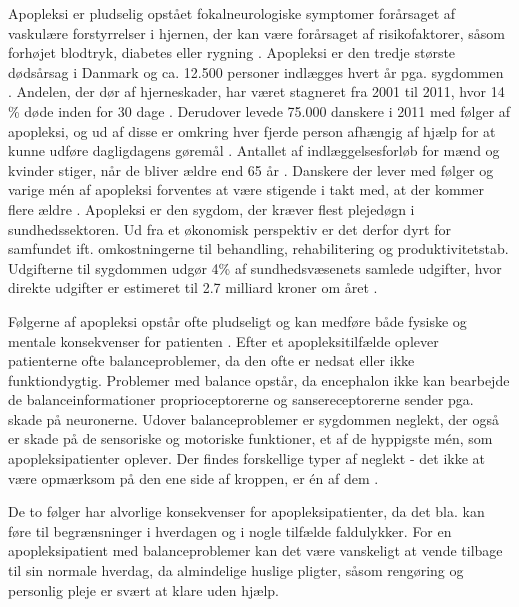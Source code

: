 Apopleksi er pludselig opstået fokalneurologiske symptomer forårsaget af vaskulære forstyrrelser i hjernen, der kan være forårsaget af risikofaktorer, såsom forhøjet blodtryk, diabetes eller rygning \cite{Sundhedsstyrelsen2009,Academic2015}. Apopleksi er den tredje største dødsårsag i Danmark og ca. 12.500 personer indlægges hvert år pga. sygdommen \cite{Hjernesagen2015a}. Andelen, der dør af hjerneskader, har været stagneret fra 2001 til 2011, hvor 14 \% døde inden for 30 dage \cite{Hjernesagen2015}. Derudover levede 75.000 danskere i 2011 med følger af apopleksi, og ud af disse er omkring hver fjerde person afhængig af hjælp for at kunne udføre dagligdagens gøremål \cite{Hjernesagen2015a}. Antallet af indlæggelsesforløb for mænd og kvinder stiger, når de bliver ældre end 65 år \cite{Sundhedsstyrelsen2011}.
Danskere der lever med følger og varige mén af apopleksi forventes at være stigende i takt med, at der kommer flere ældre \cite{Sagen2014}. Apopleksi er den sygdom, der kræver flest plejedøgn i sundhedssektoren. Ud fra et økonomisk perspektiv er det derfor dyrt for samfundet ift. omkostningerne til behandling, rehabilitering og produktivitetstab.  Udgifterne til sygdommen udgør 4\% af sundhedsvæsenets samlede udgifter, hvor direkte udgifter er estimeret til 2.7 milliard kroner om året \cite{Hjernesagen2015a, Kruuse2014}.
 
Følgerne af apopleksi opstår ofte pludseligt og kan medføre både fysiske og mentale konsekvenser for patienten \cite{Muus2008}. Efter et apopleksitilfælde oplever patienterne ofte balanceproblemer, da den ofte er nedsat eller ikke funktiondygtig. Problemer med balance opstår, da encephalon ikke kan bearbejde de balanceinformationer proprioceptorerne og sansereceptorerne sender pga. skade på neuronerne. \cite{Karnath2003} Udover balanceproblemer er sygdommen neglekt, der også er skade på de sensoriske og motoriske funktioner, et af de hyppigste mén, som apopleksipatienter oplever. Der findes forskellige typer af neglekt - det ikke at være opmærksom på den ene side af kroppen, er én af dem . \cite{Sundhed.dk} 

De to følger har alvorlige konsekvenser for apopleksipatienter, da det bla. kan føre til begrænsninger i hverdagen og i nogle tilfælde faldulykker. \cite{Muus2008,Nichols1997} For en apopleksipatient med balanceproblemer kan det være vanskeligt at vende tilbage til sin normale hverdag, da almindelige huslige pligter, såsom rengøring og personlig pleje er svært at klare uden hjælp. \cite{Sundhedsstyrelsen2010} \\  

